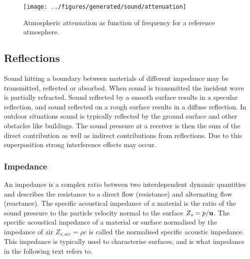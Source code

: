 
\begin{figure}[H]
        \centering
        \texttt{[image: ../figures/generated/sound/attenuation]}
        \caption{Atmospheric attenuation as function of frequency for a reference atmosphere.}
        \label{fig:theory:sound:attenuation}
\end{figure}

\newpage
\subsection{Reflections}
Sound hitting a boundary between materials of different impedance may be
transmitted, reflected or absorbed. When sound is transmitted the incident wave
is partially refracted. Sound reflected by a smooth surface results in a
specular reflection, and sound reflected on a rough surface results in a diffuse
reflection. In outdoor situations sound is typically reflected by the ground
surface and other obstacles like buildings. The sound pressure at a receiver is
then the sum of the direct contribution as well as indirect contributions from
reflections. Due to this superposition strong interference effects may occur.

\subsubsection*{Impedance}
An impedance is a complex ratio between two interdependent dynamic quantities
and describes the resistance to a direct flow (resistance) and alternating flow
(reactance). The specific acoustical impedance of a material is the ratio of the
sound pressure to the particle velocity normal to the surface $Z_{s} =
p/\mathbf{u}$. The specific acoustical impedance of a material or surface
normalised by the impedance of air $Z_{s, air} = \rho c$ is called the
normalised specific acoustic impedance. This impedance is typically used to
characterise surfaces, and is what impedance in the following text refers to.

